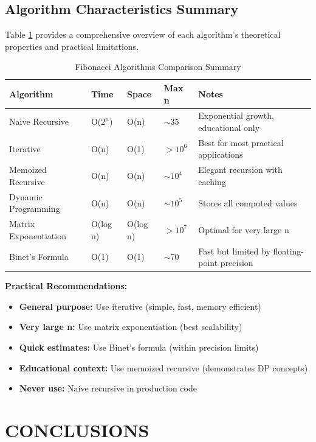 \documentclass[12pt]{article}
\begin{document}
\subsection{Algorithm Characteristics Summary}

Table \ref{tab:summary} provides a comprehensive overview of each algorithm's theoretical properties and practical limitations.

\begin{table}[H]
\centering
\caption{Fibonacci Algorithms Comparison Summary}
\label{tab:summary}
\footnotesize
\begin{tabular}{@{}p{3.5cm}p{2cm}p{1.5cm}p{1.5cm}p{5cm}@{}}
\toprule
\textbf{Algorithm} & \textbf{Time} & \textbf{Space} & \textbf{Max n} & \textbf{Notes} \\ 
\midrule
Naive Recursive & O($2^n$) & O(n) & $\sim$35 & Exponential growth, educational only \\ 
\midrule
Iterative & O(n) & O(1) & $>10^6$ & Best for most practical applications \\ 
\midrule
Memoized Recursive & O(n) & O(n) & $\sim10^4$ & Elegant recursion with caching \\ 
\midrule
Dynamic Programming & O(n) & O(n) & $\sim10^5$ & Stores all computed values \\ 
\midrule
Matrix Exponentiation & O(log n) & O(log n) & $>10^7$ & Optimal for very large n \\ 
\midrule
Binet's Formula & O(1) & O(1) & $\sim$70 & Fast but limited by floating-point precision \\ 
\bottomrule
\end{tabular}
\end{table}

\textbf{Practical Recommendations:}
\begin{itemize}
    \item \textbf{General purpose:} Use iterative (simple, fast, memory efficient)
    \item \textbf{Very large n:} Use matrix exponentiation (best scalability)
    \item \textbf{Quick estimates:} Use Binet's formula (within precision limits)
    \item \textbf{Educational context:} Use memoized recursive (demonstrates DP concepts)
    \item \textbf{Never use:} Naive recursive in production code
\end{itemize}

\clearpage
\section{CONCLUSIONS}
\end{document}
